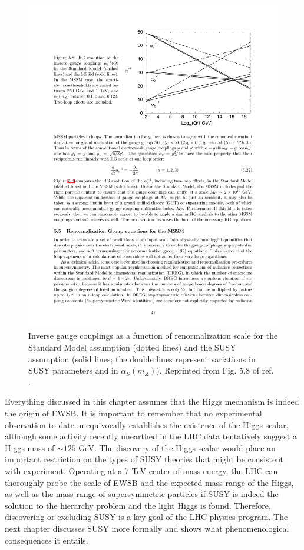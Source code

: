 \documentclass[dissertation.tex]{subfiles}
\begin{document}
\begin{figure}
	\centering
	\includegraphics[scale=1.0]{SUSY_grand_unification}
	\caption{Inverse gauge couplings as a function of renormalization scale for the Standard Model assumption (dotted lines) and the SUSY assumption (solid lines; the double lines represent variations in SUSY parameters and in $\alpha_{S}(m_{Z})$).  Reprinted from Fig. 5.8 of ref. \cite{SUSY_primer}.}
	\label{fig:SUSY_grand_unification}
\end{figure}

Everything discussed in this chapter assumes that the Higgs mechanism is indeed the origin of EWSB.  It is important to remember that no experimental observation to date unequivocally establishes the existence of the Higgs scalar, although some activity recently unearthed in the LHC data \cite{Chatrchyan201226,Aad201249} tentatively suggest a Higgs mass of $\sim125$ GeV.  The discovery of the Higgs scalar would place an important restriction on the types of SUSY theories that might be consistent with experiment.  Operating at a 7 TeV center-of-mass energy, the LHC can thoroughly probe the scale of EWSB and the expected mass range of the Higgs, as well as the mass range of supersymmetric particles if SUSY is indeed the solution to the hierarchy problem and the light Higgs is found.  Therefore, discovering or excluding SUSY is a key goal of the LHC physics program.  The next chapter discusses SUSY more formally and shows what phenomenological consequences it entails.
\end{document}
